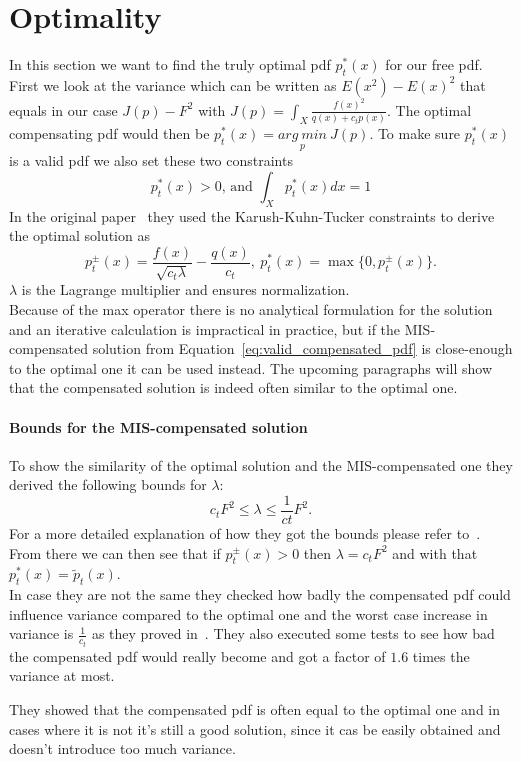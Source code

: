 \section{Optimality}
\label{sec:misc_optimality}
In this section we want to find the truly optimal pdf $ p_t^*(x) $ for our free pdf.
First we look at the variance
which can be written as $ E(x^2) - E(x)^2 $ that equals in our case $ J(p) - F^2 $ with $ J(p) = \int_X \frac{f(x)^2}{q(x) + c_t p(x)} $.
The optimal compensating pdf would then be $ p_t^*(x) = \underset{p}{arg~min}~J(p) $.
To make sure $ p_t^*(x) $ is a valid pdf we also set these two constraints $$ p_t^*(x) > 0 \text{, and } \int_X p_t^*(x) dx = 1 $$
In the original paper~\cite[Appendix~A]{Karlik2019} they used the Karush-Kuhn-Tucker constraints
to derive the optimal solution as $$ p_t^{\pm}(x) = \frac{f(x)}{\sqrt{c_t \lambda}} - \frac{q(x)}{c_t},~p_t^*(x) = \max\{0, p_t^{\pm}(x)\}. $$
$ \lambda $ is the Lagrange multiplier and ensures normalization.\\
Because of the max operator there is no analytical formulation for the solution and an iterative calculation is impractical in practice,
but if the MIS-compensated solution from Equation~\ref{eq:valid_compensated_pdf} is close-enough to the optimal one it can be used instead.
The upcoming paragraphs will show that the compensated solution is indeed often similar to the optimal one.

\paragraph{Bounds for the MIS-compensated solution}
To show the similarity of the optimal solution and the MIS-compensated one
they derived the following bounds for $ \lambda $: $$ c_t F^2 \leq \lambda \leq \frac{1}{ct} F^2. $$
For a more detailed explanation of how they got the bounds please refer to~\cite[Appendix~B]{Karlik2019}.
From there we can then see that if $ p_t^{\pm}(x) > 0 $ then $ \lambda = c_t F^2 $ and with that $ p_t^*(x) = \tilde{p}_t(x) $.\\
In case they are not the same they checked how badly the compensated pdf could influence variance compared to the optimal one
and the worst case increase in variance is $ \frac{1}{c_t} $ as they proved in~\cite[Appendix~C]{Karlik2019}.
They also executed some tests to see how bad the compensated pdf would really become
and got a factor of $ 1.6 $ times the variance at most.

They showed that the compensated pdf is often equal to the optimal one
and in cases where it is not it's still a good solution,
since it cas be easily obtained and doesn't introduce too much variance.


